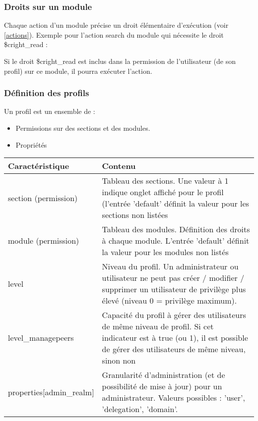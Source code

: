 \subsubsection{Droits sur un module}

Chaque action d'un module précise un droit élémentaire d'exécution (voir \ref{actions}).
Exemple pour l'action search du module \user qui nécessite le droit \$cright\_read :\\


Si le droit \$cright\_read est inclus dans la permission de l'utilisateur (de son profil) sur ce module, il pourra exécuter l'action. 


\subsubsection{Définition des profils}

Un profil est un ensemble de :
\begin{itemize}
\item Permissions sur des sections et des modules.
\item Propriétés
\end{itemize}

\begin{tabular}{|p{5cm}|p{8cm}|}
\hline
\textbf{Caractéristique} & \textbf{Contenu} \\
\hline
section (permission) & Tableau des sections. Une valeur à 1 indique onglet affiché pour le profil (l'entrée 'default' définit la valeur pour les sections non listées \\ 
\hline
module (permission) & Tableau des modules. Définition des droits à chaque module. L'entrée 'default' définit la valeur pour les modules non listés \\ 
\hline
level & Niveau du profil. Un administrateur ou utilisateur ne peut pas créer / modifier / supprimer un utilisateur de privilège plus élevé (niveau 0 = privilège maximum).\\ 
\hline
level\_managepeers & Capacité du profil à gérer des utilisateurs de même niveau de profil. Si cet indicateur est à true (ou 1), il est possible de gérer des utilisateurs de même niveau, sinon non \\ 
\hline
properties[admin\_realm] & Granularité d'administration (et de possibilité de mise à jour) pour un administrateur. Valeurs possibles : 'user', 'delegation', 'domain'.\\
\hline
\end{tabular}
\vspace{0.3cm}

